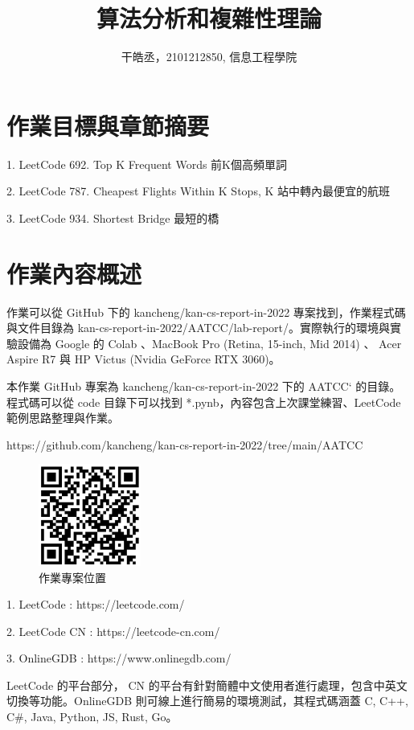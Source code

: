 \documentclass[10pt,UTF8]{ctexart}
\title{算法分析和複雜性理論}
\author{干皓丞，2101212850, 信息工程學院}
\begin{document}
\maketitle


\section{作業目標與章節摘要}

1. LeetCode 692. Top K Frequent Words 前K個高頻單詞

2. LeetCode 787. Cheapest Flights Within K Stops, K 站中轉內最便宜的航班

3. LeetCode 934. Shortest Bridge 最短的橋


\section{作業內容概述}

作業可以從 GitHub 下的 kancheng/kan-cs-report-in-2022 專案找到，作業程式碼與文件目錄為 kan-cs-report-in-2022/AATCC/lab-report/。實際執行的環境與實驗設備為 Google 的 Colab 、MacBook Pro (Retina, 15-inch, Mid 2014) 、 Acer Aspire R7 與 HP Victus (Nvidia GeForce RTX 3060)。

本作業 GitHub 專案為 kancheng/kan-cs-report-in-2022 下的 AATCC` 的目錄。程式碼可以從 code 目錄下可以找到 *.pynb，內容包含上次課堂練習、LeetCode 範例思路整理與作業。

https://github.com/kancheng/kan-cs-report-in-2022/tree/main/AATCC

\begin{figure}[H]
\centering 
\includegraphics[width=0.30\textwidth]{aatccqr.png} 
\caption{作業專案位置}
\label{Test}
\end{figure}


1. LeetCode : https://leetcode.com/

2. LeetCode CN : https://leetcode-cn.com/

3. OnlineGDB : https://www.onlinegdb.com/ 

LeetCode 的平台部分， CN 的平台有針對簡體中文使用者進行處理，包含中英文切換等功能。OnlineGDB 則可線上進行簡易的環境測試，其程式碼涵蓋 C, C++, C\#, Java, Python, JS, Rust, Go。
\end{document}
